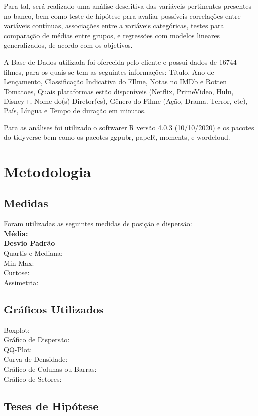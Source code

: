 \documentclass[a4paper, 12pt]{article} %
\begin{document}
Para tal, será realizado uma análise descritiva das variáveis pertinentes presentes no banco, bem como teste de hipótese para avaliar possíveis correlações entre variáveis contínuas, associações entre a variáveis categóricas, testes para comparação de médias entre grupos, e regressões com modelos lineares generalizados, de acordo com os objetivos.

A Base de Dados utilizada foi oferecida pelo cliente e possui dados de 16744 filmes, para os quais se tem as seguintes informações: Título, Ano de Lençamento, Classificação Indicativa do FIlme, Notas no IMDb e Rotten Tomatoes, Quais plataformas estão disponíveis (Netflix, PrimeVideo, Hulu, Disney+, Nome do(s) Diretor(es), Gênero do Filme (Ação, Drama, Terror, etc), País, Língua e Tempo de duração em minutos. 

Para as análises foi utilizado o softwarer R versão 4.0.3 (10/10/2020) e os pacotes do tidyverse bem como os pacotes ggpubr, papeR, moments, 
e wordcloud.

\section{Metodologia}

\subsection{Medidas}
Foram utilizadas as seguintes medidas de posição e dispersão:\\
\textbf{Média:}\\
\textbf{Desvio Padrão}\\
Quartis e Mediana:\\
Min Max:\\
Curtose:\\
Assimetria:\\

\subsection{Gráficos Utilizados}
Boxplot:\\
Gráfico de Dispersão:\\
QQ-Plot:\\
Curva de Densidade:\\
Gráfico de Colunas ou Barras:\\
Gráfico de Setores:\\

\subsection{Teses de Hipótese}
\end{document}
